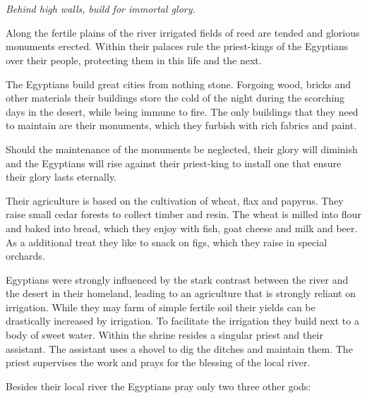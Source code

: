 \section{}\label{ch:Tribes:Egyptians}

\begin{flushright}
	\emph{Behind high walls, build for immortal glory.}
\end{flushright}

Along the fertile plains of the river irrigated fields of reed are tended and
glorious monuments erected. Within their palaces rule the priest-kings of the
\gls{Egyptians} over their people, protecting them in this life and the next.

The \gls{Egyptians} build great cities from nothing stone. Forgoing wood,
bricks and other materials their buildings store the cold of the night during
the scorching days in the desert, while being immune to fire. The only
buildings that they need to maintain are their monuments, which they furbish
with rich fabrics and paint.

Should the maintenance of the monuments be neglected, their glory will diminish
and the \gls{Egyptians} will rise against their priest-king to install one that
ensure their glory lasts eternally.

Their agriculture is based on the cultivation of wheat, flax and papyrus. They
raise small cedar forests to collect timber and resin. The wheat is milled into
flour and baked into bread, which they enjoy with fish, goat cheese and milk
and beer. As a additional treat they like to snack on figs, which they raise in
special orchards.

\Gls{Egyptians} were strongly influenced by the stark contrast between
the river and the desert in their homeland,
leading to an agriculture that is strongly reliant on irrigation.
While they may farm of simple fertile soil their yields can be drastically
increased by irrigation.
To facilitate the irrigation they build  next to a body of sweet water.
Within the shrine resides a singular priest and their assistant.
The assistant uses a shovel to dig the ditches and maintain them.
The priest supervises the work and prays for the blessing of the local river.

Besides their local river the \gls{Egyptians} pray only two three other gods:


